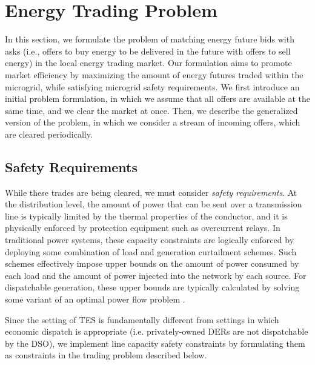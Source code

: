 \section{Energy Trading Problem}
\label{sec:problem}

\newcommand{\vect}[1]{\ensuremath{\boldsymbol{#1}}}
\newcommand{\ve}{\vect{e}}
\newcommand{\vp}{\vect{p}}
\newcommand{\vpi}{\vect{\pi}}

\newcommand{\calB}[0]{\ensuremath{\mathcal{B}}}
\newcommand{\calF}[0]{\ensuremath{\mathcal{F}}}
\newcommand{\calM}[0]{\ensuremath{\mathcal{M}}}
\newcommand{\calS}[0]{\ensuremath{\mathcal{S}}}

In this section, we formulate the problem of matching energy future bids with asks (i.e., offers to buy energy to be delivered in the future with offers to sell energy) in the local energy trading market. Our formulation aims to promote market efficiency by maximizing the amount of energy futures traded within the microgrid, while satisfying microgrid safety requirements. We first introduce an initial problem formulation, in which we assume that all offers are available at the same time, and we clear the market at once.  Then, we describe the generalized version of the problem, in which we consider a stream of incoming offers, which are cleared periodically. %

\subsection{Safety Requirements}

While these trades are being cleared, we must consider \emph{safety requirements}.  
 At the distribution level, the amount of power that can be sent over a transmission line is typically limited by the thermal properties of the conductor, and it is physically enforced by protection equipment such as overcurrent relays. In traditional power systems, these capacity constraints are logically enforced by deploying some combination of load and generation curtailment schemes. Such schemes effectively impose upper bounds on the amount of power consumed by each load and the amount of power injected into the network by each source. For dispatchable generation, these upper bounds are typically calculated by solving some variant of an optimal power flow problem \cite{OPFtutorial}. 

Since the setting of TES is fundamentally different from settings in which economic dispatch is appropriate (i.e. privately-owned DERs are not dispatchable by the DSO), we implement line capacity safety constraints by formulating them as constraints in the trading problem described below. 

